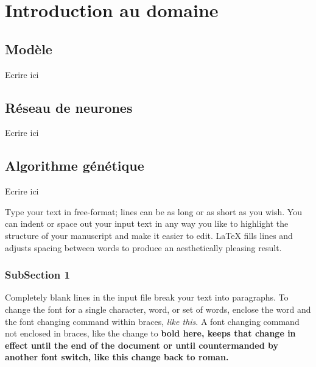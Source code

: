 \chapter{Introduction au domaine}

\section{Modèle}
Ecrire ici

\section{Réseau de neurones}
Ecrire ici

\section{Algorithme génétique}
Ecrire ici

Type your text in free-format; lines can be as long
or as short
as you wish.
      You can indent      or space out
        your input
          text in
            any way you like to highlight the structure
      of your manuscript and make it easier to edit.
LaTeX fills lines and adjusts spacing between words to produce an
aesthetically pleasing result.

\subsection{SubSection 1}
Completely blank lines in the input file break your text into
paragraphs.
To change the font for a single character, word, or set of words,
enclose the word and the font changing command within braces,
{\em like this}.
A font changing command not enclosed in braces, like the change to \bf
bold here, keeps that change in effect until the end of the document or
until countermanded by another font switch, like this change back to
\rm roman. 

\clearpage
